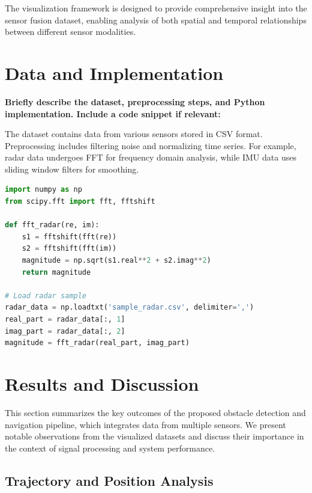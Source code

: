 \documentclass[12pt,a4paper]{article}
\begin{document}
The visualization framework is designed to provide comprehensive insight into the sensor fusion dataset, enabling analysis of both spatial and temporal relationships between different sensor modalities.
\section{Data and Implementation}
\textbf{Briefly describe the dataset, preprocessing steps, and Python implementation. Include a code snippet if relevant:}

The dataset contains data from various sensors stored in CSV format. Preprocessing includes filtering noise and normalizing time series. For example, radar data undergoes FFT for frequency domain analysis, while IMU data uses sliding window filters for smoothing.

\begin{lstlisting}[language=Python, caption=Radar Data undergoes FFT]
import numpy as np
from scipy.fft import fft, fftshift

def fft_radar(re, im):
    s1 = fftshift(fft(re))
    s2 = fftshift(fft(im))
    magnitude = np.sqrt(s1.real**2 + s2.imag**2)
    return magnitude

# Load radar sample
radar_data = np.loadtxt('sample_radar.csv', delimiter=',')
real_part = radar_data[:, 1]
imag_part = radar_data[:, 2]
magnitude = fft_radar(real_part, imag_part)

\end{lstlisting}
\section{Results and Discussion}

This section summarizes the key outcomes of the proposed obstacle detection and navigation pipeline, which integrates data from multiple sensors. We present notable observations from the visualized datasets and discuss their importance in the context of signal processing and system performance.

\subsection{Trajectory and Position Analysis}
\end{document}
